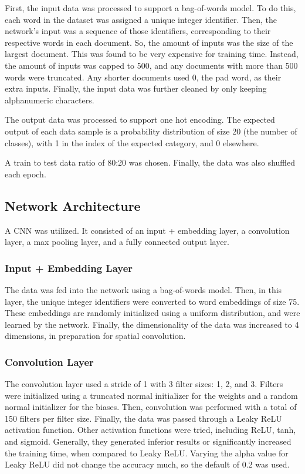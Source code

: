 \documentclass{article}
\begin{document}
First, the input data was processed to support a bag-of-words model. To do this, each word in the dataset was assigned a unique integer
identifier. Then, the network's input was a sequence of those identifiers, corresponding to their respective words in each document. So,
the amount of inputs was the size of the largest document. This was found to be very expensive for training time. Instead, the
amount of inputs was capped to 500, and any documents with more than 500 words were truncated. Any shorter documents used 0, the pad word,
as their extra inputs. Finally, the input data was further cleaned by only keeping alphanumeric characters.

The output data was processed to support one hot encoding. The expected output of each data sample is a probability distribution of size
20 (the number of classes), with 1 in the index of the expected category, and 0 elsewhere.

A train to test data ratio of 80:20 was chosen. Finally, the data was also shuffled each epoch.

\subsection{Network Architecture}
A CNN was utilized. It consisted of an input + embedding layer, a convolution layer, a max pooling layer, and a fully connected output layer.

\subsubsection{Input + Embedding Layer}
The data was fed into the network using a bag-of-words model. Then, in this layer, the unique integer identifiers were
converted to word embeddings of size 75. These embeddings are randomly initialized using a uniform distribution, and were learned by the
network. Finally, the dimensionality of the data was increased to 4 dimensions, in preparation for spatial convolution.

\subsubsection{Convolution Layer}
The convolution layer used a stride of 1 with 3 filter sizes: 1, 2, and 3. Filters were initialized using a truncated normal initializer for
the weights and a random normal initializer for the biases. Then, convolution was performed with a total of 150 filters
per filter size. Finally, the data was passed through a Leaky ReLU activation function. Other activation functions were tried,
including ReLU, tanh, and sigmoid. Generally, they generated inferior results or significantly increased the training time, when compared
to Leaky ReLU. Varying the alpha value for Leaky ReLU did not change the accuracy much, so the default of 0.2 was used.
\end{document}
